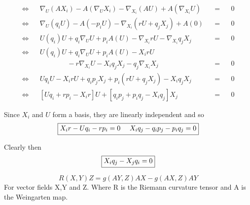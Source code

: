 \begin{align}
\nonumber
&\Leftrightarrow& &\nabla_U(AX_i)-A(\nabla_UX_i)-\nabla_{X_i}(AU)+A(\nabla_{X_i}U)& &=& &0& \\
\nonumber
&\Leftrightarrow& &\nabla_U(q_i U) - A(-p_i U) - \nabla_{X_i}(rU+ q_jX_j) + A(0)& &=& &0& \\
\nonumber
&\Leftrightarrow& &U(q_i)U+q_i\nabla_UU+p_iA(U) -\nabla_{X_i}rU-\nabla_{X_i}q_jX_j& &=& &0&\\
\nonumber
&\Leftrightarrow& &U(q_i)U+q_i\nabla_UU+p_iA(U) - X_irU  & &\ & &\ & \\
\nonumber
&\ & & \ \ \ \ \ \ \ \ \ \ \ \ \ \ \ \ \ \ - r\nabla_{X_i}U-X_iq_jX_j-q_j\nabla_{X_i}X_j& &=& &0& \\
\nonumber
&\Leftrightarrow& &Uq_iU - X_irU+q_ip_jX_j + p_i(rU+q_jX_j)-X_iq_jX_j& &=& &0& \\
\nonumber
&\Leftrightarrow& &[Uq_i + rp_i-X_ir]U+[q_ip_j+p_iq_j-X_iq_j]X_j& &=& &0&
\end{align}

Since $X_i$ and $U$ form a basis, they are linearly independent and so
\begin{equation}
\framebox{$X_ir - Uq_i - rp_i = 0 \ \ \ \ X_iq_j-q_ip_j-p_iq_j=0$}
\label{Codazzi}
\end{equation}

Clearly then 
\begin{equation}
\framebox{$X_iq_j - X_jq_i = 0$}
\label{Xiqjcom}
\end{equation}

\begin{definition}
\begin{displaymath}
R(X,Y)Z=g(AY,Z)AX-g(AX,Z)AY
\end{displaymath}
For vector fields X,Y and Z. Where R is the Riemann curvature tensor and A is the Weingarten map.
\end{definition}

